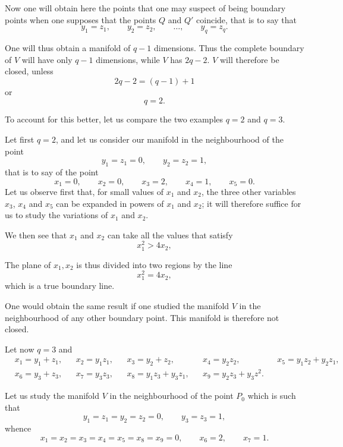 \documentclass{article}
\begin{document}
Now one will obtain here the points that one may suspect of being boundary points when one supposes that the points $Q$ and $Q'$ coincide, that is to say that
\[ y_{1} = z_{1}, \qquad y_{2} = z_{2}, \qquad \ldots, \qquad y_{q} = z_{q}. \]

One will thus obtain a manifold of $q - 1$ dimensions. Thus the complete boundary of $V$ will have only $q - 1$ dimensions, while $V$ has $2q - 2$. $V$ will therefore be closed, unless
\[ 2q - 2 = (q - 1) + 1 \]
or
\[ q = 2. \]

To account for this better, let us compare the two examples $q = 2$ and $q = 3$.

Let first $q = 2$, and let us consider our manifold in the neighbourhood of the point
\[ y_{1} = z_{1} = 0, \qquad y_{2} = z_{2} = 1, \]
that is to say of the point
\[ x_{1} = 0, \qquad x_{2} = 0, \qquad x_{3} = 2, \qquad x_{4} = 1, \qquad x_{5} = 0. \]
Let us observe first that, for small values of $x_{1}$ and $x_{2}$, the three other variables $x_{3}$, $x_{4}$ and $x_{5}$ can be expanded in powers of $x_{1}$ and $x_{2}$; it will therefore suffice for us to study the variations of $x_{1}$ and $x_{2}$.

We then see that $x_{1}$ and $x_{2}$ can take all the values that satisfy
\[ x^{2}_{1} > 4x_{2}, \]

The plane of $x_{1}, x_{2}$ is thus divided into two regions by the line
\[ x^{2}_{1} = 4x_{2}, \]
which is a true boundary line.

One would obtain the same result if one studied the manifold $V$ in the neighbourhood of any other boundary point. This manifold is therefore not closed.

Let now $q = 3$ and
\[ \begin{aligned} &x_{1} = y_{1} + z_{1}, &&x_{2} = y_{1}z_{1}, &&x_{3} = y_{2} + z_{2}, &&x_{4} = y_{2}z_{2}, &&x_{5} = y_{1}z_{2} + y_{2}z_{1},\\ &x_{6} = y_{3} + z_{3}, &&x_{7} = y_{3}z_{3}, &&x_{8} = y_{1}z_{3} + y_{3}z_{1}, &&x_{9} = y_{2}z_{3} + y_{3}z^{2}. \end{aligned} \]

Let us study the manifold $V$ in the neighbourhood of the point $P_{0}$ which is such that
\[ y_{1} = z_{1} = y_{2} = z_{2} = 0, \qquad y_{3} = z_{3} = 1, \]
whence
\[ x_{1} = x_{2} = x_{3} = x_{4} = x_{5} = x_{8} = x_{9} = 0, \qquad x_{6} = 2, \qquad x_{7} = 1. \]
\end{document}

